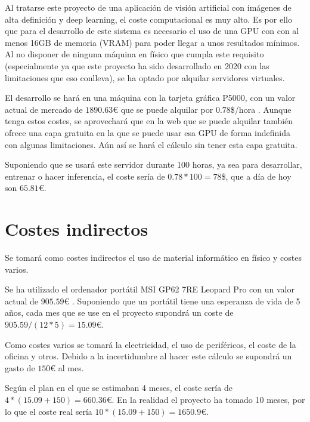 Al tratarse este proyecto de una aplicación de visión artificial con imágenes de alta definición y deep learning, el coste computacional es muy alto. Es por ello que para el desarrollo de este sistema es necesario el uso de una GPU con con al menos 16GB de memoria (VRAM) para poder llegar a unos resultados mínimos. Al no disponer de ninguna máquina en físico que cumpla este requisito (especialmente ya que este proyecto ha sido desarrollado en 2020 con las limitaciones que eso conlleva), se ha optado por alquilar servidores virtuales.

El desarrollo se hará en una máquina con la tarjeta gráfica P5000, con un valor actual de mercado de $1890.63$€ \cite{amazonp5000} que se puede alquilar por $0.78$\$/hora \cite{gradientdocs}. Aunque tenga estos costes, se aprovechará que en la web que se puede alquilar también ofrece una capa gratuita en la que se puede usar esa GPU de forma indefinida con algunas limitaciones. Aún así se hará el cálculo sin tener esta capa gratuita.

Suponiendo que se usará este servidor durante 100 horas, ya sea para desarrollar, entrenar o hacer inferencia, el coste sería de $0.78 * 100 = 78$\$, que a día de hoy son $65.81$€.

\section{Costes indirectos}\label{sec:costesindirectos}

Se tomará como costes indirectos el uso de material informático en físico y costes varios.

Se ha utilizado el ordenador portátil MSI GP62 7RE Leopard Pro con un valor actual de $905.59$€ \cite{pccomponentes}. Suponiendo que un portátil tiene una esperanza de vida de 5 años, cada mes que se use en el proyecto supondrá un coste de $905.59 / (12*5) = 15.09$€.

Como costes varios se tomará la electricidad, el uso de periféricos, el coste de la oficina y otros. Debido a la incertidumbre al hacer este cálculo se supondrá un gasto de $150$€ al mes.

Según el plan en el que se estimaban 4 meses, el coste sería de $4 * (15.09 + 150) = 660.36$€. En la realidad el proyecto ha tomado 10 meses, por lo que el coste real sería $10 * (15.09 + 150) = 1650.9$€.